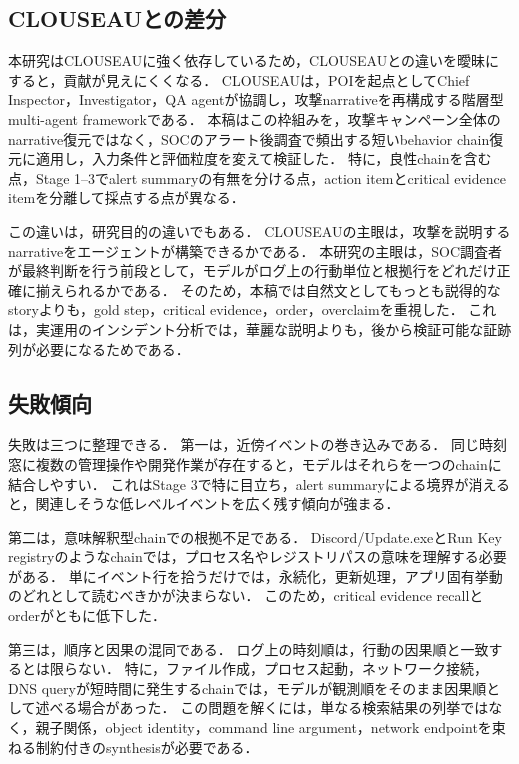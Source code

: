 \subsection{CLOUSEAUとの差分}

本研究はCLOUSEAUに強く依存しているため，CLOUSEAUとの違いを曖昧にすると，貢献が見えにくくなる．
CLOUSEAUは，POIを起点としてChief Inspector，Investigator，QA agentが協調し，攻撃narrativeを再構成する階層型multi-agent frameworkである．
本稿はこの枠組みを，攻撃キャンペーン全体のnarrative復元ではなく，SOCのアラート後調査で頻出する短いbehavior chain復元に適用し，入力条件と評価粒度を変えて検証した．
特に，良性chainを含む点，Stage 1--3でalert summaryの有無を分ける点，action itemとcritical evidence itemを分離して採点する点が異なる．

この違いは，研究目的の違いでもある．
CLOUSEAUの主眼は，攻撃を説明するnarrativeをエージェントが構築できるかである．
本研究の主眼は，SOC調査者が最終判断を行う前段として，モデルがログ上の行動単位と根拠行をどれだけ正確に揃えられるかである．
そのため，本稿では自然文としてもっとも説得的なstoryよりも，gold step，critical evidence，order，overclaimを重視した．
これは，実運用のインシデント分析では，華麗な説明よりも，後から検証可能な証跡列が必要になるためである．

\subsection{失敗傾向}

失敗は三つに整理できる．
第一は，近傍イベントの巻き込みである．
同じ時刻窓に複数の管理操作や開発作業が存在すると，モデルはそれらを一つのchainに結合しやすい．
これはStage 3で特に目立ち，alert summaryによる境界が消えると，関連しそうな低レベルイベントを広く残す傾向が強まる．

第二は，意味解釈型chainでの根拠不足である．
Discord/Update.exeとRun Key registryのようなchainでは，プロセス名やレジストリパスの意味を理解する必要がある．
単にイベント行を拾うだけでは，永続化，更新処理，アプリ固有挙動のどれとして読むべきかが決まらない．
このため，critical evidence recallとorderがともに低下した．

第三は，順序と因果の混同である．
ログ上の時刻順は，行動の因果順と一致するとは限らない．
特に，ファイル作成，プロセス起動，ネットワーク接続，DNS queryが短時間に発生するchainでは，モデルが観測順をそのまま因果順として述べる場合があった．
この問題を解くには，単なる検索結果の列挙ではなく，親子関係，object identity，command line argument，network endpointを束ねる制約付きのsynthesisが必要である．

